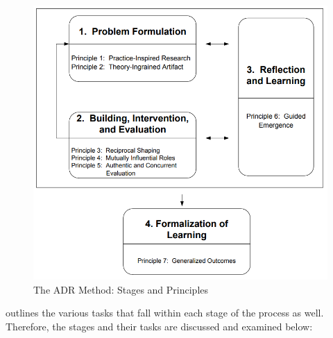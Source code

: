 \begin{figure}[h!]
        \centering
        \includegraphics[width=1\linewidth]{img/ADR stages and principles.png}
        \caption{The ADR Method: Stages and Principles}
        \label{fig:enter-label}
    \end{figure}
\par{\cite{sein2011action} outlines the various tasks that fall within each stage of the process as well. Therefore, the stages and their tasks are discussed and examined below:}
